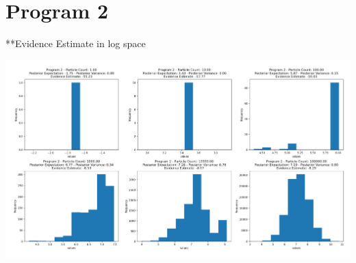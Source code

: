 \documentclass[10pt]{homeworg}
\begin{document}
\newpage

\section*{Program 2}
\small{**Evidence Estimate in log space}
\begin{center}
\hspace*{-1cm}
\includegraphics[scale=0.5]{figures/program2/program2.png}
\end{center}

\newpage
\end{document}

